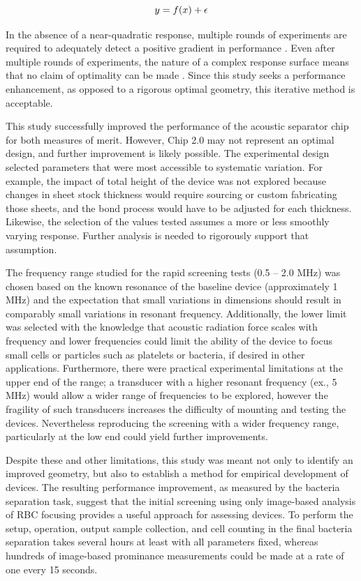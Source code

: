 \begin{equation}
\label{eqn:response}
  \hfill y=f(x)+\epsilon \hfill
\end{equation}

In the absence of a near-quadratic response, multiple rounds of experiments are required to adequately detect a positive gradient in performance \cite{carley2004response}. Even after multiple rounds of experiments, the nature of a complex response surface means that no claim of optimality can be made \cite{box2006improving}. Since this study seeks a performance enhancement, as opposed to a rigorous optimal geometry, this iterative method is acceptable.   

This study successfully improved the performance of the acoustic separator chip for both measures of merit. However, Chip 2.0 may not represent an optimal design, and further improvement is likely possible.  The experimental design selected parameters that were most accessible to systematic variation.  For example, the impact of total height of the device was not explored because changes in sheet stock thickness would require sourcing or custom fabricating those sheets, and the bond process would have to be adjusted for each thickness.  Likewise, the selection of the values tested assumes a more or less smoothly varying response.  Further analysis is needed to rigorously support that assumption.   

The frequency range studied for the rapid screening tests (0.5 -- 2.0 MHz) was chosen based on the known resonance of the baseline device (approximately 1 MHz) and the expectation that small variations in dimensions should result in comparably small variations in resonant frequency.  Additionally, the lower limit was selected with the knowledge that acoustic radiation force scales with frequency and lower frequencies could limit the ability of the device to focus small cells or particles such as platelets or bacteria, if desired in other applications.  Furthermore, there were practical experimental limitations at the upper end of the range; a transducer with a higher resonant frequency (ex., 5 MHz) would allow a wider range of frequencies to be explored, however the fragility of such transducers increases the difficulty of mounting and testing the devices.  Nevertheless reproducing the screening with a wider frequency range, particularly at the low end could yield further improvements.


Despite these and other limitations, this study was meant not only to identify an improved geometry, but also to establish a method for empirical development of devices.  The resulting performance improvement, as measured by the bacteria separation task, suggest that the initial screening using only image-based analysis of RBC focusing provides a useful approach for assessing devices.  To perform the setup, operation, output sample collection, and cell counting in the final bacteria separation takes several hours at least with all parameters fixed, whereas hundreds of image-based prominance measurements could be made at a rate of one every 15 seconds. 

